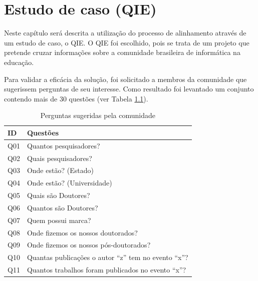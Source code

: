 \chapter{Estudo de caso (QIE)}
\label{cap:estudo}
Neste capítulo será descrita a utilização do processo de alinhamento através de um estudo de caso, o QIE. O QIE foi escolhido, pois se trata de um projeto que pretende cruzar informações sobre a comunidade brasileira de informática na educação.

Para validar a eficácia da solução, foi solicitado a membros da comunidade que sugerissem perguntas de seu interesse. Como resultado foi levantado um conjunto contendo mais de 30 questões (ver Tabela \ref{tab:questions}).

\begin{table}[!ht]
\centering
\caption{Perguntas sugeridas pela comunidade}
\label{tab:questions}
\begin{tabular}{|l|l|}
\hline
ID  & Questões                                                                          \\ \hline
Q01 & Quantos pesquisadores?                                                            \\ \hline
Q02 & Quais pesquisadores?                                                              \\ \hline
Q03 & Onde estão? (Estado)                                                              \\ \hline
Q04 & Onde estão? (Universidade)                                                        \\ \hline
Q05 & Quais são Doutores?                                                               \\ \hline
Q06 & Quantos são Doutores?                                                             \\ \hline
Q07 & Quem possui marca?                                                                \\ \hline
Q08 & Onde fizemos os nossos doutorados?                                                \\ \hline
Q09 & Onde fizemos os nossos pós-doutorados?                                            \\ \hline
Q10 & Quantas publicações o autor “z” tem no evento “x”?                                \\ \hline
Q11 & Quantos trabalhos foram publicados no evento “x”?                                 \\ \hline

\end{tabular}
\end{table}

